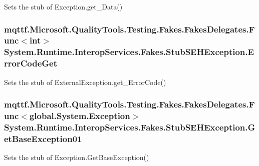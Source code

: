 Sets the stub of Exception.\-get\-\_\-\-Data()

\hypertarget{class_system_1_1_runtime_1_1_interop_services_1_1_fakes_1_1_stub_s_e_h_exception_ad3816f80dc528237914fd4e0a7ad1464}{
\subsubsection[{Error\-Code\-Get}]{\setlength{\rightskip}{0pt plus 5cm}mqttf.\-Microsoft.\-Quality\-Tools.\-Testing.\-Fakes.\-Fakes\-Delegates.\-Func$<$int$>$ System.\-Runtime.\-Interop\-Services.\-Fakes.\-Stub\-S\-E\-H\-Exception.\-Error\-Code\-Get}}\label{class_system_1_1_runtime_1_1_interop_services_1_1_fakes_1_1_stub_s_e_h_exception_ad3816f80dc528237914fd4e0a7ad1464}


Sets the stub of External\-Exception.\-get\-\_\-\-Error\-Code()

\hypertarget{class_system_1_1_runtime_1_1_interop_services_1_1_fakes_1_1_stub_s_e_h_exception_a0d47ff9c6fb7741ae966d702c9066b81}{
\subsubsection[{Get\-Base\-Exception01}]{\setlength{\rightskip}{0pt plus 5cm}mqttf.\-Microsoft.\-Quality\-Tools.\-Testing.\-Fakes.\-Fakes\-Delegates.\-Func$<$global.\-System.\-Exception$>$ System.\-Runtime.\-Interop\-Services.\-Fakes.\-Stub\-S\-E\-H\-Exception.\-Get\-Base\-Exception01}}\label{class_system_1_1_runtime_1_1_interop_services_1_1_fakes_1_1_stub_s_e_h_exception_a0d47ff9c6fb7741ae966d702c9066b81}


Sets the stub of Exception.\-Get\-Base\-Exception()

